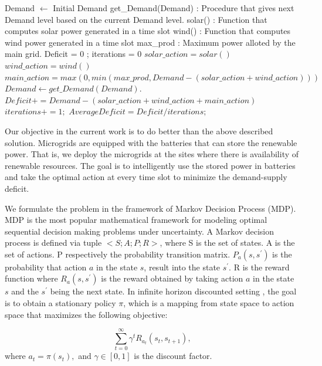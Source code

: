 \documentclass[conference]{IEEEtran}
\begin{document}
\begin{algorithm}
\caption{}
\label{greedy}
\begin{algorithmic}[1]
	\State Demand $\leftarrow$ Initial Demand
    \State get\_Demand(Demand) : Procedure that gives next Demand level based on the current Demand level.
    \State solar() : Function that computes solar power generated in a time slot
    \State wind() : Function that computes wind power generated in a time slot
    \State max\_prod : Maximum power alloted by the main grid.
    \State Deficit = 0 ; iterations = 0
     \State $solar\_action = solar()$
     \State $wind\_action = wind()$
     \State $main\_action = max(0,min(max\_prod, Demand - (solar\_action+wind\_action)))$
     \State $Demand \leftarrow get\_Demand(Demand).$
     \State $Deficit += Demand - (solar\_action + wind\_action + main\_action)$
     \State $iterations += 1;$
    \EndProcedure
    \State $Average Deficit = Deficit/iterations;$
    
\end{algorithmic}
\end{algorithm}


Our objective in the current work is to do better than the above described solution. Microgrids are equipped with the batteries that can store the renewable power. That is, we deploy the microgrids at the sites where there is availability of renewable resources. The goal is to intelligently use the stored power in batteries and take the optimal action at every time slot to minimize the demand-supply deficit.

We formulate the problem in the framework of Markov Decision Process (MDP). MDP \cite{sutton} is the most popular mathematical framework for modeling optimal sequential decision making problems under uncertainty. A Markov decision process is defined via tuple $< S; A; P;R >$, where S is the set of states. A is the set of actions. P respectively the probability transition matrix. $P_{a}(s,s^{'})$ is the probability that action $a$ in the state $s$, result into the state $s^{'}$. R is the reward function where $R_{a}(s,s^{'})$ is the reward obtained by taking action $a$ in the state $s$ and the $s^{'}$ being the next state. In infinite horizon discounted setting \cite{vol1}, the goal is to obtain a stationary policy $\pi$, which is a mapping from state space to action space that maximizes the following objective:

\begin{equation}
\sum_{t = 0}^{\infty} \gamma^{t}R_{a_{t}}(s_{t},s_{t+1}),
\end{equation}
where $a_{t} = \pi(s_{t}),$ and $\gamma \in [0,1]$ is the discount factor.
\end{document}
